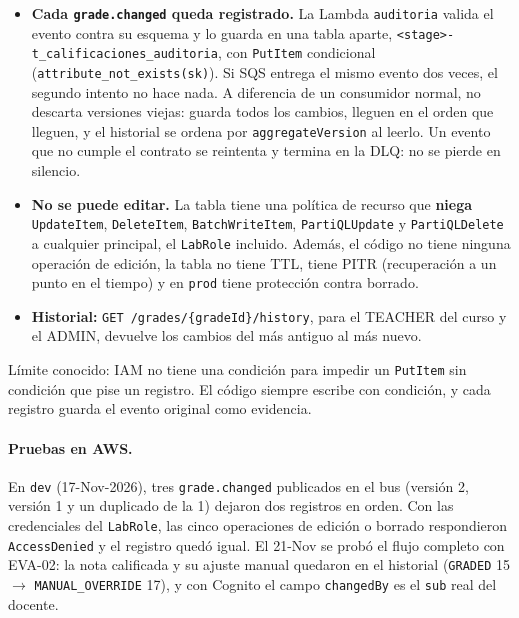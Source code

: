 \begin{itemize}
  \item \textbf{Cada \texttt{grade.changed} queda registrado.} La Lambda \texttt{auditoria} valida el
        evento contra su esquema y lo guarda en una tabla aparte,
        \texttt{<stage>-t\_calificaciones\_auditoria}, con \texttt{PutItem} condicional
        (\texttt{attribute\_not\_exists(sk)}). Si SQS entrega el mismo evento dos veces, el segundo
        intento no hace nada. A diferencia de un consumidor normal, no descarta versiones viejas: guarda
        todos los cambios, lleguen en el orden que lleguen, y el historial se ordena por
        \texttt{aggregateVersion} al leerlo. Un evento que no cumple el contrato se reintenta y termina
        en la DLQ: no se pierde en silencio.
  \item \textbf{No se puede editar.} La tabla tiene una política de recurso que \textbf{niega}
        \texttt{UpdateItem}, \texttt{DeleteItem}, \texttt{BatchWriteItem}, \texttt{PartiQLUpdate} y
        \texttt{PartiQLDelete} a cualquier principal, el \texttt{LabRole} incluido. Además, el código no
        tiene ninguna operación de edición, la tabla no tiene TTL, tiene PITR (recuperación a un punto en
        el tiempo) y en \texttt{prod} tiene protección contra borrado.
  \item \textbf{Historial:} \texttt{GET /grades/\{gradeId\}/history}, para el TEACHER del curso y el
        ADMIN, devuelve los cambios del más antiguo al más nuevo.
\end{itemize}

Límite conocido: IAM no tiene una condición para impedir un \texttt{PutItem} sin condición que pise un
registro. El código siempre escribe con condición, y cada registro guarda el evento original como
evidencia.

\paragraph{Pruebas en AWS.} En \texttt{dev} (17-Nov-2026), tres \texttt{grade.changed} publicados en el
bus (versión 2, versión 1 y un duplicado de la 1) dejaron dos registros en orden. Con las credenciales
del \texttt{LabRole}, las cinco operaciones de edición o borrado respondieron \texttt{AccessDenied} y el
registro quedó igual. El 21-Nov se probó el flujo completo con EVA-02: la nota calificada y su ajuste
manual quedaron en el historial (\texttt{GRADED} 15 $\rightarrow$ \texttt{MANUAL\_OVERRIDE} 17), y con
Cognito el campo \texttt{changedBy} es el \texttt{sub} real del docente.


